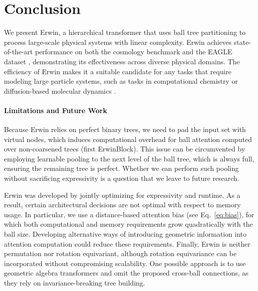 \section{Conclusion}
We present Erwin, a hierarchical transformer that uses ball tree partitioning to process large-scale physical systems with linear complexity. Erwin achieves state-of-the-art performance on both the cosmology benchmark \cite{Balla2024ACB} and the EAGLE dataset \cite{Janny2023EagleLL}, demonstrating its effectiveness across diverse physical domains.
The efficiency of Erwin makes it a suitable candidate for any tasks that require modeling large particle systems, such as tasks in computational chemistry \cite{Fu2023MOFDiffCD} or diffusion-based molecular dynamics \cite{Jing2024GenerativeMO}.


\vspace{-5pt}
\paragraph{Limitations and Future Work}
Because Erwin relies on perfect binary trees, we need to pad the input set with virtual nodes, which induces computational overhead for ball attention computed over non-coarsened trees (first ErwinBlock). This issue can be circumvented by employing learnable pooling to the next level of the ball tree, which is always full, ensuring the remaining tree is perfect. Whether we can perform such pooling without sacrificing expressivity is a question that we leave to future research.

Erwin was developed by jointly optimizing for expressivity and runtime. As a result, certain architectural decisions are not optimal with respect to memory usage. In particular, we use a distance-based attention bias (see Eq.~\ref{eq:bias}), for which both computational and  memory requirements grow quadratically with the ball size. Developing alternative ways of introducing geometric information into attention computation could reduce these requirements.
Finally, Erwin is neither permutation nor rotation equivariant, although rotation equivariance can be incorporated without compromising scalability. One possible approach is to use geometric algebra transformers \cite{Brehmer2023GeometricAT} and omit the proposed cross-ball connections, as they rely on invariance-breaking tree building. %






